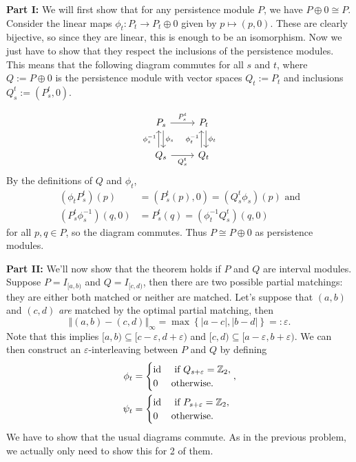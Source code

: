 \documentclass[twoside,10pt]{article}
\begin{document}
\textbf{Part I:} We will first show that for any persistence module $P$, we have $P \oplus 0 \cong P$. Consider the linear maps $\phi_t:P_t \to P_t \oplus 0$ given by $p \mapsto (p,0)$. These are clearly bijective, so since they are linear, this is enough to be an isomorphism. Now we just have to show that they respect the inclusions of the persistence modules. This means that the following diagram commutes for all $s$ and $t$, where $Q := P \oplus 0$ is the persistence module with vector spaces $Q_t := P_t$ and inclusions $Q_{s}^{t} := (P_s^t, 0)$.

\[
\begin{tikzcd}
	P_s \rar{P_{s}^{t}}\dar[shift left]{\phi_s} & P_{t} \dar[shift left]{\phi_t} \\
	Q_s \uar[shift left]{\phi_{s}^{-1}} \rar["Q_{s}^{t}"'] & Q_t \uar[shift left]{\phi_t^{-1}}
\end{tikzcd}
\] By the definitions of $Q$ and $\phi_t$,
\begin{align*}
	(\phi_t P_{s}^{t})(p) &= (P_{s}^{t}(p), 0) = (Q_{s}^{t} \phi_s)(p) \text{ and}\\
	(P_{s}^{t}\phi_{s}^{-1})(q,0) &= P_{s}^{t}(q) = (\phi_{t}^{-1}Q_{s}^{t})(q, 0)
\end{align*}
for all $p, q \in P$, so the diagram commutes. Thus $P \cong P \oplus 0$ as persistence modules.

\textbf{Part II:} We'll now show that the theorem holds if $P$ and $Q$ are interval modules. Suppose $P = I_{[a,b)}$ and $Q = I_{[c,d)}$, then there are two possible partial matchings: they are either both matched or neither are matched. Let's suppose that $ (a,b)$ and $(c,d)$ \textit{are} matched by the optimal partial matching, then
\[
	{\Vert{(a,b)-(c,d)}\Vert}_{\infty} = \max\left\{ |a-c|, |b-d| \right\} =: \varepsilon.
\] 
Note that this implies $[a,b) \subseteq [c-\varepsilon,d+\varepsilon)$ and $[c,d) \subseteq [a-\varepsilon,b+\varepsilon)$. We can then construct an $\varepsilon$-interleaving between $P$ and $Q$ by defining
\begin{align*}
	\phi_t &=
	\begin{cases}
		\operatorname{id}_{} & \text{ if } Q_{s+\varepsilon}= \mathbb{Z}_2,\\
		0 & \text{otherwise}.
	\end{cases},\\
	\psi_t &=
	\begin{cases}
		\operatorname{id}_{} & \text{ if } P_{s+\varepsilon}=\mathbb{Z}_2,\\
		0 & \text{otherwise}.
	\end{cases}
\end{align*}
We have to show that the usual diagrams commute. As in the previous problem, we actually only need to show this for 2 of them.
\end{document}
